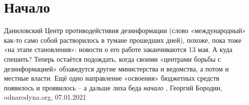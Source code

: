  
 
 
 
 
\chapter{Начало}

Даниловский Центр противодейстивия дезинформации (слово «международный» как-то
само собой растворилось в тумане прошедших дней), похоже, пока тоже «на этапе
становления»: новости о его работе заканчиваются 13 мая. А куда спешить?
Теперь остаётся подождать, когда своими «центрами борьбы с дезинформацией»
обзаведутся другие министерства и ведомства, а потом и местные власти. Ещё одно
направление «освоения» бюджетных средств появилось и проявилось – а дальше лиха
беда \emph{начало}
, Георгий Бородин, odnarodyna.org, 07.01.2021
